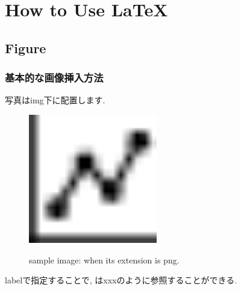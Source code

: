 \renewcommand{\prechaptername}{付録}
\renewcommand{\postchaptername}{}
\renewcommand{\thechapter}{\Alph{chapter}}

\chapter{How to Use \LaTeX }

\section{Figure}
    \subsection{基本的な画像挿入方法}
    写真はimg下に配置します.
    \begin{figure}[htbp]
        \centering   
        \includegraphics[width=0.5\textwidth]{img/appendix1/sample_png.png}
        \label{fig:sample_png}
        \caption[sample image (png)]{sample image: when its extension is png.}
    \end{figure}
    
    labelで指定することで, はxxxのように参照することができる.
    
